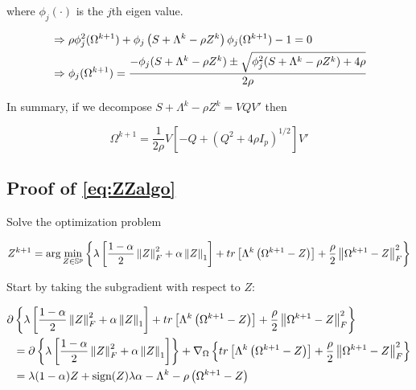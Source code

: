 \documentclass[11pt,]{report}
\theoremstyle{definition}
\theoremstyle{definition}
\theoremstyle{definition}
\theoremstyle{remark}
\begin{document}
where \(\phi_{j}(\cdot)\) is the \(j\)th eigen value.

\begin{equation}
\begin{split}
  &\Rightarrow \rho\phi_{j}^{2}(\Omega^{k + 1}) + \phi_{j}\left( S + \Lambda^{k} - \rho Z^{k} \right)\phi_{j}(\Omega^{k + 1}) - 1 = 0 \\
  &\Rightarrow \phi_{j}(\Omega^{k + 1}) = \frac{-\phi_{j}(S + \Lambda^{k} - \rho Z^{k}) \pm \sqrt{\phi_{j}^{2}(S + \Lambda^{k} - \rho Z^{k}) + 4\rho}}{2\rho}
\end{split}
\notag
\end{equation}

In summary, if we decompose \(S + \Lambda^{k} - \rho Z^{k} = VQV'\) then

\begin{equation}
\Omega^{k + 1} = \frac{1}{2\rho}V\left[ -Q + (Q^{2} + 4\rho I_{p})^{1/2}\right] V'
\label{eq:appendixomegaproof}
\end{equation}

\hypertarget{proofZZalgo}{%
\subsection{Proof of \eqref{eq:ZZalgo}}\label{proofZZalgo}}

Solve the optimization problem

\begin{equation}
Z^{k + 1} = \arg\min_{Z \in \mathbb{S}^{p}}\left\{ \lambda\left[ \frac{1 - \alpha}{2}\left\| Z \right\|_{F}^{2} + \alpha\left\| Z \right\|_{1} \right] + tr\left[\Lambda^{k}\left(\Omega^{k + 1} - Z\right)\right] + \frac{\rho}{2}\left\| \Omega^{k + 1} - Z \right\|_{F}^{2} \right\}
\label{eq:appendixZZloglik}\notag
\end{equation}

Start by taking the subgradient with respect to \(Z\):

\begin{equation}
\begin{split}
  \partial&\left\{ \lambda\left[ \frac{1 - \alpha}{2}\left\| Z \right\|_{F}^{2} + \alpha\left\| Z \right\|_{1} \right] + tr\left[\Lambda^{k}\left(\Omega^{k + 1} - Z\right)\right] + \frac{\rho}{2}\left\| \Omega^{k + 1} - Z \right\|_{F}^{2} \right\} \\
  &= \partial\left\{ \lambda\left[ \frac{1 - \alpha}{2}\left\| Z \right\|_{F}^{2} + \alpha\left\| Z \right\|_{1} \right] \right\} + \nabla_{\Omega}\left\{ tr\left[\Lambda^{k}\left(\Omega^{k + 1} - Z\right)\right] + \frac{\rho}{2}\left\| \Omega^{k + 1} - Z \right\|_{F}^{2} \right\} \\
  &= \lambda(1 - \alpha)Z + \mbox{sign}(Z)\lambda\alpha - \Lambda^{k} - \rho\left( \Omega^{k + 1} - Z \right)
\label{eq:appendixZZgradient}\notag
\end{split}
\end{equation}
\end{document}
